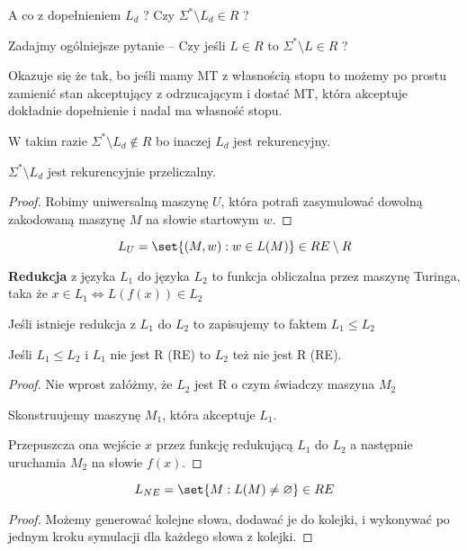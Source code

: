 A co z dopełnieniem \( L_d \) ? Czy \( \Sigma^* \setminus L_d \in R \) ?

Zadajmy ogólniejsze pytanie -- Czy jeśli \( L \in R \) to \( \Sigma^* \setminus L \in R \) ?

Okazuje się że tak, bo jeśli mamy MT z własnością  stopu to możemy po prostu zamienić stan akceptujący z odrzucającym i dostać MT, która akceptuje dokładnie dopełnienie i nadal ma własność stopu.

W takim razie \( \Sigma^* \setminus L_d \notin R \) bo inaczej \( L_d \) jest rekurencyjny.

\begin{lemma}
	\( \Sigma^* \setminus L_d \) jest rekurencyjnie przeliczalny.
\end{lemma}
\begin{proof}
	Robimy uniwersalną maszynę \( U \), która potrafi zasymulować dowolną zakodowaną maszynę \( M \) na słowie startowym \( w \).
\end{proof}

\begin{lemma}
	\[
		L_U = \set{(M, w) : w \in L(M)} \in RE \setminus R
	\]
\end{lemma}

\begin{definition}
	\textbf{Redukcja} z języka \( L_1 \) do języka \( L_2 \) to funkcja obliczalna przez maszynę Turinga, taka że \( x \in L_1 \iff L(f(x)) \in L_2 \)

	Jeśli istnieje redukcja z \( L_1 \) do \( L_2 \) to zapisujemy to faktem \( L_1 \leq L_2 \)
\end{definition}

\begin{lemma}
	Jeśli \( L_1 \leq L_2 \) i \( L_1 \) nie jest R (RE) to \( L_2 \) też nie jest R (RE).
\end{lemma}
\begin{proof}
	Nie wprost załóżmy, że \( L_2 \) jest R o czym świadczy maszyna \( M_2 \)

	Skonstruujemy maszynę \( M_1 \), która akceptuje \( L_1 \).

	Przepuszcza ona wejście \( x \) przez funkcję redukującą \( L_1 \) do \( L_2\) a następnie uruchamia \( M_2 \) na słowie \( f(x) \).
\end{proof}

\begin{lemma}
	\[
		L_{NE} = \set{ M : L(M) \neq \varnothing } \in RE
	\]
\end{lemma}
\begin{proof}
	Możemy generować kolejne słowa, dodawać je do kolejki, i wykonywać po jednym kroku symulacji dla każdego słowa z kolejki.
\end{proof}

